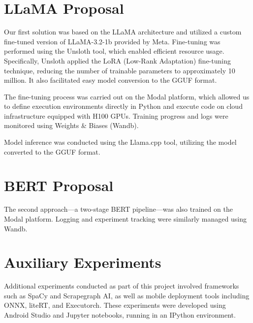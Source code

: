 \documentclass[licencjacka,en]{pracamgr}
\begin{document}
\section{LLaMA Proposal}

Our first solution was based on the LLaMA architecture and utilized a custom fine-tuned version of LLaMA-3.2-1b provided by Meta\cite{meta-llama}. Fine-tuning was performed using the Unsloth\cite{unsloth} tool, which enabled efficient resource usage. Specifically, Unsloth applied the LoRA (Low-Rank Adaptation) fine-tuning technique\cite{hu2021loralowrankadaptationlarge}, reducing the number of trainable parameters to approximately 10 million. It also facilitated easy model conversion to the GGUF format.

The fine-tuning process was carried out on the Modal platform\cite{modal}, which allowed us to define execution environments directly in Python and execute code on cloud infrastructure equipped with H100 GPUs. Training progress and logs were monitored using Weights \& Biases (Wandb)\cite{wandb}.

Model inference was conducted using the Llama.cpp\cite{llama-cpp} tool, utilizing the model converted to the GGUF format.

\section{BERT Proposal}

The second approach—a two-stage BERT pipeline—was also trained on the Modal platform. Logging and experiment tracking were similarly managed using Wandb.

\section{Auxiliary Experiments}

Additional experiments conducted as part of this project involved frameworks such as SpaCy\cite{spacy}\cite{spacy-exp} and Scrapegraph AI\cite{scapegraph_repo}\cite{scrapegraph-exp}, as well as mobile deployment tools including ONNX\cite{onnx}\cite{onnx-exp}, liteRT\cite{lite-rt}\cite{lite-rt-exp}, and Executorch\cite{executorch}\cite{executorch-exp}. These experiments were developed using Android Studio\cite{android-studio}\cite{service_demo_app_repo} and Jupyter notebooks\cite{jupyter}, running in an IPython\cite{ipython} environment.
\end{document}
